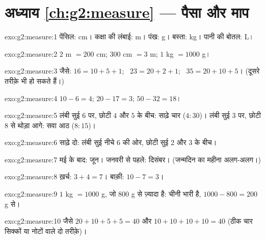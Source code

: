 \section*{अध्याय \ref{ch:g2:measure} --- पैसा और माप}

\begin{solution}{exo:g2:measure:1}
पेंसिल: cm। कक्षा की लंबाई: m। पंख: g। बस्ता: kg। पानी की
बोतल: L।
\end{solution}

\begin{solution}{exo:g2:measure:2}
$2$ m $= 200$ cm; \quad $300$ cm $= 3$ m; \quad $1$ kg $= 1000$ g।
\end{solution}

\begin{solution}{exo:g2:measure:3}
जैसे: $16 = 10 + 5 + 1$; \ $23 = 20 + 2 + 1$; \
$35 = 20 + 10 + 5$। (दूसरे तरीक़े भी हो सकते हैं।)
\end{solution}

\begin{solution}{exo:g2:measure:4}
$10 - 6 = 4$; \quad $20 - 17 = 3$; \quad $50 - 32 = 18$।
\end{solution}

\begin{solution}{exo:g2:measure:5}
लंबी सुई $6$ पर, छोटी $4$ और $5$ के बीच: साढ़े चार
($4{:}30$)। लंबी सुई $3$ पर, छोटी $8$ से थोड़ा आगे: सवा
आठ ($8{:}15$)।
\end{solution}

\begin{solution}{exo:g2:measure:6}
साढ़े दो: लंबी सुई नीचे $6$ की ओर, छोटी सुई $2$ और $3$ के
बीच।
\end{solution}

\begin{solution}{exo:g2:measure:7}
मई के बाद: जून। जनवरी से पहले: दिसंबर। (जन्मदिन का महीना अलग-अलग।)
\end{solution}

\begin{solution}{exo:g2:measure:8}
ख़र्च: $3 + 4 = 7$। बाक़ी: $10 - 7 = 3$।
\end{solution}

\begin{solution}{exo:g2:measure:9}
$1$ kg $= 1000$ g, जो $800$ g से ज़्यादा है: चीनी भारी है,
$1000 - 800 = 200$ g से।
\end{solution}

\begin{solution}{exo:g2:measure:10}
जैसे $20 + 10 + 5 + 5 = 40$ और $10 + 10 + 10 + 10 = 40$
(ठीक चार सिक्कों या नोटों वाले दो तरीक़े)।
\end{solution}
